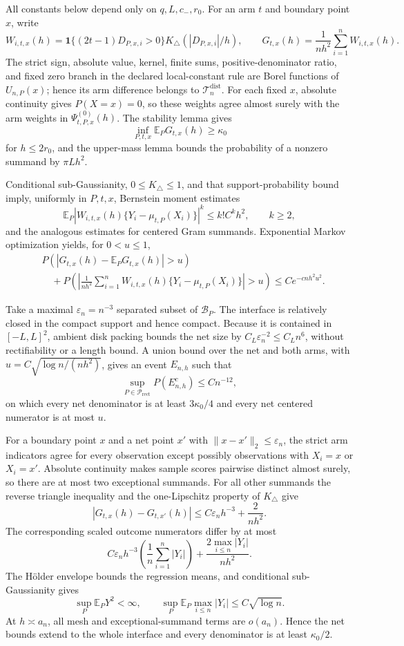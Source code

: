 All constants below depend only on \(q,L,c_-,r_0\).  For an arm \(t\) and boundary point \(x\), write
\[
 W_{i,t,x}(h)=\mathbf1\{(2t-1)D_{P,x,i}>0\}
 K_\triangle(|D_{P,x,i}|/h),
 \qquad
 G_{t,x}(h)=\frac1{nh^2}\sum_{i=1}^nW_{i,t,x}(h).
\]
The strict sign, absolute value, kernel, finite sums, positive-denominator ratio, and fixed zero branch in the declared local-constant rule are Borel functions of \(U_{n,P}(x)\); hence its arm difference belongs to \(\mathcal T_n^{\mathrm{dist}}\).  For each fixed \(x\), absolute continuity gives \(P(X=x)=0\), so these weights agree almost surely with the arm weights in \(\Psi^{(0)}_{t,P,x}(h)\).  The stability lemma gives
\[
 \inf_{P,t,x}\mathbb E_PG_{t,x}(h)\geq\kappa_0
\]
for \(h\leq2r_0\), and the upper-mass lemma bounds the probability of a nonzero summand by \(\pi Lh^2\).

Conditional sub-Gaussianity, \(0\leq K_\triangle\leq1\), and that support-probability bound imply, uniformly in \(P,t,x\), Bernstein moment estimates
\[
 \mathbb E_P|W_{i,t,x}(h)\{Y_i-\mu_{t,P}(X_i)\}|^k
 \leq k!C^kh^2,
 \qquad k\geq2,
\]
and the analogous estimates for centered Gram summands.  Exponential Markov optimization yields, for \(0<u\leq1\),
\[
\begin{aligned}
 &P\!\left(|G_{t,x}(h)-\mathbb E_PG_{t,x}(h)|>u\right)\\
 &\quad+P\!\left(\left|\frac1{nh^2}\sum_{i=1}^nW_{i,t,x}(h)
 \{Y_i-\mu_{t,P}(X_i)\}\right|>u\right)
 \leq Ce^{-cnh^2u^2}.
\end{aligned}
\]

Take a maximal \(\varepsilon_n=n^{-3}\) separated subset of \(\mathcal B_P\).  The interface is relatively closed in the compact support and hence compact.  Because it is contained in \([-L,L]^2\), ambient disk packing bounds the net size by \(C_L\varepsilon_n^{-2}\leq C_Ln^6\), without rectifiability or a length bound.  A union bound over the net and both arms, with \(u=C\sqrt{\log n/(nh^2)}\), gives an event \(E_{n,h}\) such that
\[
 \sup_{P\in\mathcal P_{\mathrm{rect}}}P(E_{n,h}^c)\leq Cn^{-12},
\]
on which every net denominator is at least \(3\kappa_0/4\) and every net centered numerator is at most \(u\).

For a boundary point \(x\) and a net point \(x'\) with \(\lVert x-x'\rVert_2\leq\varepsilon_n\), the strict arm indicators agree for every observation except possibly observations with \(X_i=x\) or \(X_i=x'\).  Absolute continuity makes sample scores pairwise distinct almost surely, so there are at most two exceptional summands.  For all other summands the reverse triangle inequality and the one-Lipschitz property of \(K_\triangle\) give
\[
 |G_{t,x}(h)-G_{t,x'}(h)|
 \leq C\varepsilon_nh^{-3}+\frac2{nh^2}.
\]
The corresponding scaled outcome numerators differ by at most
\[
 C\varepsilon_nh^{-3}\left(\frac1n\sum_{i=1}^n|Y_i|\right)
 +\frac{2\max_{i\leq n}|Y_i|}{nh^2}.
\]
The H\"older envelope bounds the regression means, and conditional sub-Gaussianity gives
\[
 \sup_P\mathbb E_PY^2<\infty,
 \qquad
 \sup_P\mathbb E_P\max_{i\leq n}|Y_i|\leq C\sqrt{\log n}.
\]
At \(h\asymp a_n\), all mesh and exceptional-summand terms are \(o(a_n)\).  Hence the net bounds extend to the whole interface and every denominator is at least \(\kappa_0/2\).

